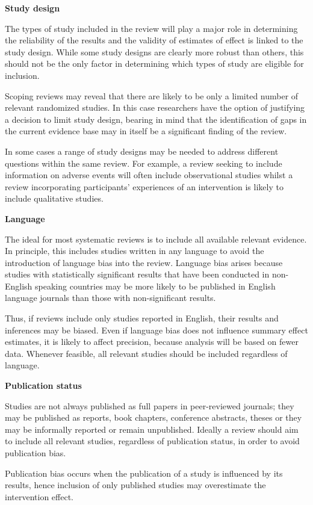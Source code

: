 \documentclass[
  10pt,
  a4paper,
  DIV=11,
  numbers=noendperiod]{scrreprt}
\begin{document}
\textbf{Study design}

The types of study included in the review will play a major role in
determining the reliability of the results and the validity of estimates
of effect is linked to the study design. While some study designs are
clearly more robust than others, this should not be the only factor in
determining which types of study are eligible for inclusion.

Scoping reviews may reveal that there are likely to be only a limited
number of relevant randomized studies. In this case researchers have the
option of justifying a decision to limit study design, bearing in mind
that the identification of gaps in the current evidence base may in
itself be a significant finding of the review.

In some cases a range of study designs may be needed to address
different questions within the same review. For example, a review
seeking to include information on adverse events will often include
observational studies whilst a review incorporating participants'
experiences of an intervention is likely to include qualitative studies.

\textbf{Language}

The ideal for most systematic reviews is to include all available
relevant evidence. In principle, this includes studies written in any
language to avoid the introduction of language bias into the review.
Language bias arises because studies with statistically significant
results that have been conducted in non-English speaking countries may
be more likely to be published in English language journals than those
with non-significant results.

Thus, if reviews include only studies reported in English, their results
and inferences may be biased. Even if language bias does not influence
summary effect estimates, it is likely to affect precision, because
analysis will be based on fewer data. Whenever feasible, all relevant
studies should be included regardless of language.

\textbf{Publication status}

Studies are not always published as full papers in peer-reviewed
journals; they may be published as reports, book chapters, conference
abstracts, theses or they may be informally reported or remain
unpublished. Ideally a review should aim to include all relevant
studies, regardless of publication status, in order to avoid publication
bias.

Publication bias occurs when the publication of a study is influenced by
its results, hence inclusion of only published studies may overestimate
the intervention effect.
\end{document}
